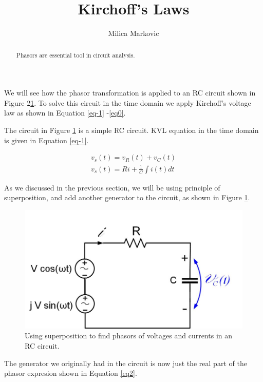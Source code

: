 \documentclass{ximera}
\title{Kirchoff's Laws}
\author{Milica Markovic}
\begin{document}
  
\begin{abstract}  
Phasors are essential tool in circuit analysis.
\end{abstract}  
\maketitle    



We will see how the phasor transformation is applied to an RC circuit shown in Figure 2\ref{RCcirc}.  To solve this circuit in the time domain we apply Kirchoff's voltage law as shown in Equation \ref{eq-1} -\ref{eq0}.


The circuit in Figure \ref{RCcirc} is a simple RC circuit. KVL equation in the time domain is given in Equation \ref{eq-1}.

\begin{eqnarray}
        v_s(t)=v_R(t)+v_C(t)                \label{eq-1}  \\
v_s(t) = R i + \frac{1}{C} \int i(t) dt \label{eq0}
\end{eqnarray} 


As we discussed in the previous section, we will be using principle of superposition, and add another generator to the circuit, as shown in Figure \ref{RCcirc}.

\begin{figure}[htbp]
\begin{center}
\includegraphics[scale=0.5]{../jpg/RCcircuitPhasorSup.jpg}
\end{center}
\caption{Using superposition to find phasors of voltages and currents in an RC circuit.}
\label{RCcirc}
\end{figure}

The generator we originally had in the circuit is now just the real part of the phasor expresion shown in Equation \ref{eq2}.
\end{document}
